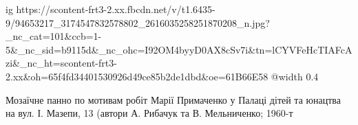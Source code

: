  
 
 
 
 

\ifcmt
  ig https://scontent-frt3-2.xx.fbcdn.net/v/t1.6435-9/94653217_3174547832578802_2616035258251870208_n.jpg?_nc_cat=101&ccb=1-5&_nc_sid=b9115d&_nc_ohc=I92OM4byyD0AX8cSv7i&tn=lCYVFeHcTIAFcAzi&_nc_ht=scontent-frt3-2.xx&oh=65f4fd34401530926d49ce85b2de1dbd&oe=61B66E58
  @width 0.4
\fi


Мозаїчне панно по мотивам робіт Марії Примаченко у Палаці дітей та юнацтва на
вул. І. Мазепи, 13 (автори А. Рибачук та В. Мельниченко; 1960-т
